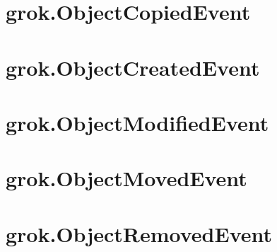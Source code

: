     \section{grok.ObjectCopiedEvent}

    \section{grok.ObjectCreatedEvent}

    \section{grok.ObjectModifiedEvent}

    \section{grok.ObjectMovedEvent}

    \section{grok.ObjectRemovedEvent}
